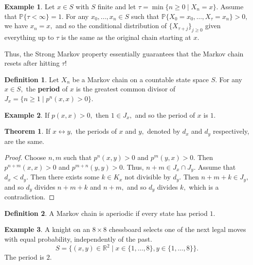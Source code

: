 \documentclass[10pt, oneside]{article}
\newcommand{\bbR}{\mathbb{R}}
\newcommand{\bbP}{\mathbb{P}}
\theoremstyle{definition}
\newtheorem{exmp}{Example}[section]
\newtheorem{thm}{Theorem}
\newtheorem{defn}{Definition}
\begin{document}
\begin{exmp}
    Let $x\in S$ with $S$ finite and let $\tau = \min\{n \geq 0 \mid X_n = x\}.$ Assume that $\bbP\{\tau < \infty\} = 1.$ For any $x_0, \dots, x_n \in S$ such that 
    $\bbP\{X_0 = x_0, \dots, X_\tau = x_n\} >0,$ we have $x_n = x,$ and so the conditional distribution of $\{X_{\tau + j}\}_{j \geq 0}$ given everything up to $\tau$ is the same as the original chain starting at $x.$ 

    Thus, the Strong Markov property essentially guarantees that the Markov chain resets after hitting $\tau$!
\end{exmp}
    
\begin{defn}
    Let $X_n$ be a Markov chain on a countable state space $S.$ For any $x\in S,$ the \textbf{period} of $x$ is the greatest common divisor of $J_x = \{n \geq 1 \mid p^n(x,x) >0\}.$
\end{defn}
\begin{exmp}
    If $p(x,x) >0,$ then $1 \in J_x,$ and so the period of $x$ is $1.$
\end{exmp}

\begin{thm}
    If $x\leftrightarrow y,$ the periods of $x$ and $y,$ denoted by $d_x$ and $d_y$ respectively, are the same. 
\end{thm}
\begin{proof}
    Choose $n, m$ such that $p^n(x,y) >0$ and $p^m(y,x) >0.$ Then $p^{n +m}(x,x) >0$ and $p^{m + n}(y,y) >0.$ Thus, $ n + m \in J_x \cap J_y.$ Assume that $d_x < d_y.$ Then there exists some $k \in K_x$ not divisible by $d_y.$ Then $n + m + k \in J_y,$ and so $d_y$ divides $n + m + k$ and $n + m,$ and so $d_y$ divides $k,$ which is a contradiction.    
\end{proof}

\begin{defn}
    A Markov chain is aperiodic if every state has period $1.$
\end{defn}

\begin{exmp}
    A knight on an $8\times 8$ chessboard selects one of the next legal moves with equal probability, independently of the past. 
    \[S = \{(x,y) \in \bbR^2 \mid x \in \{1, \dots, 8\}, y \in \{1, \dots, 8\}\}.\]  The period is $2.$ 
\end{exmp}

\newpage
\end{document}
